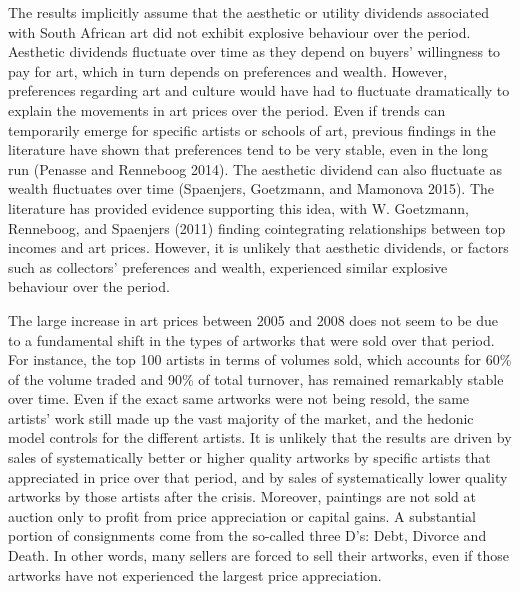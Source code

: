 \documentclass[]{elsarticle} %
\begin{document}
The results implicitly assume that the aesthetic or utility dividends
associated with South African art did not exhibit explosive behaviour
over the period. Aesthetic dividends fluctuate over time as they depend
on buyers' willingness to pay for art, which in turn depends on
preferences and wealth. However, preferences regarding art and culture
would have had to fluctuate dramatically to explain the movements in art
prices over the period. Even if trends can temporarily emerge for
specific artists or schools of art, previous findings in the literature
have shown that preferences tend to be very stable, even in the long run
(Penasse and Renneboog 2014). The aesthetic dividend can also fluctuate
as wealth fluctuates over time (Spaenjers, Goetzmann, and Mamonova
2015). The literature has provided evidence supporting this idea, with
W. Goetzmann, Renneboog, and Spaenjers (2011) finding cointegrating
relationships between top incomes and art prices. However, it is
unlikely that aesthetic dividends, or factors such as collectors'
preferences and wealth, experienced similar explosive behaviour over the
period.

The large increase in art prices between 2005 and 2008 does not seem to
be due to a fundamental shift in the types of artworks that were sold
over that period. For instance, the top 100 artists in terms of volumes
sold, which accounts for 60\% of the volume traded and 90\% of total
turnover, has remained remarkably stable over time. Even if the exact
same artworks were not being resold, the same artists' work still made
up the vast majority of the market, and the hedonic model controls for
the different artists. It is unlikely that the results are driven by
sales of systematically better or higher quality artworks by specific
artists that appreciated in price over that period, and by sales of
systematically lower quality artworks by those artists after the crisis.
Moreover, paintings are not sold at auction only to profit from price
appreciation or capital gains. A substantial portion of consignments
come from the so-called three D's: Debt, Divorce and Death. In other
words, many sellers are forced to sell their artworks, even if those
artworks have not experienced the largest price appreciation.
\end{document}
